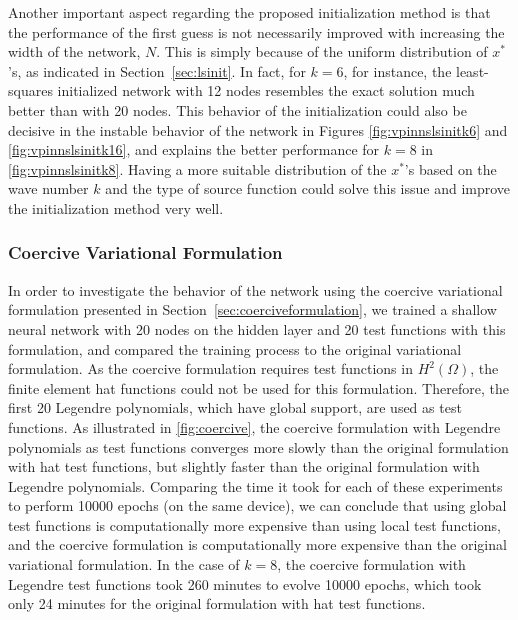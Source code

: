 Another important aspect regarding the proposed initialization method is that the performance of the first guess is not necessarily improved with increasing the width of the network, $N$. This is simply because of the uniform distribution of $x^{*}$'s, as indicated in Section~\ref{sec:lsinit}. In fact, for $k=6$, for instance, the least-squares initialized network with 12 nodes resembles the exact solution much better than with 20 nodes. This behavior of the initialization could also be decisive in the instable behavior of the network in Figures \ref{fig:vpinnslsinitk6} and \ref{fig:vpinnslsinitk16}, and explains the better performance for $k=8$ in \autoref{fig:vpinnslsinitk8}. Having a more suitable distribution of the $x^{*}$'s based on the wave number $k$ and the type of source function could solve this issue and improve the initialization method very well.

\subsubsection{Coercive Variational Formulation}\label{sec:coerciveresults}
In order to investigate the behavior of the network using the coercive variational formulation presented in Section~\ref{sec:coerciveformulation}, we trained a shallow neural network with 20 nodes on the hidden layer and 20 test functions with this formulation, and compared the training process to the original variational formulation. As the coercive formulation requires test functions in $H^2(\Omega)$, the finite element hat functions could not be used for this formulation. Therefore, the first 20 Legendre polynomials, which have global support, are used as test functions. As illustrated in \autoref{fig:coercive}, the coercive formulation with Legendre polynomials as test functions converges more slowly than the original formulation with hat test functions, but slightly faster than the original formulation with Legendre polynomials. Comparing the time it took for each of these experiments to perform 10000 epochs (on the same device), we can conclude that using global test functions is computationally more expensive than using local test functions, and the coercive formulation is computationally more expensive than the original variational formulation. In the case of $k=8$, the coercive formulation with Legendre test functions took 260 minutes to evolve 10000 epochs, which took only 24 minutes for the original formulation with hat test functions.

